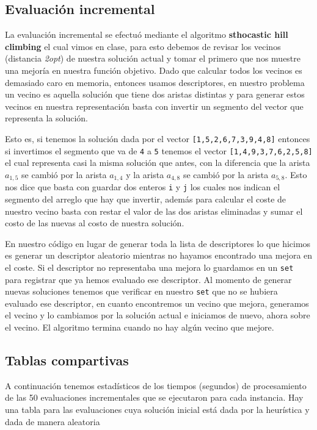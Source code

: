 \documentclass[11pt, letterpaper]{article}
\theoremstyle{definition}
\begin{document}
\subsection*{Evaluación incremental}
\noindent La evaluación incremental se efectuó mediante el algoritmo \textbf{sthocastic hill climbing} el cual vimos en clase, para esto debemos de revisar los vecinos (distancia \textit{2opt}) de nuestra solución actual y tomar el primero que nos muestre una mejoría en nuestra función objetivo. Dado que calcular todos los vecinos es demasiado caro en memoria, entonces usamos descriptores, en nuestro problema un vecino es aquella solución que tiene dos aristas distintas y para generar estos vecinos en nuestra representación basta con invertir un segmento del vector que representa la solución. 

\noindent Esto es, si tenemos la solución dada por el vector \lstinline|[1,5,2,6,7,3,9,4,8]| entonces si invertimos el segmento que va de \lstinline|4| a \lstinline|5| tenemos el vector \lstinline|[1,4,9,3,7,6,2,5,8]| el cual representa casi la misma solución que antes, con la diferencia que la arista $a_{1,5}$ se cambió por la arista $a_{1,4}$ y la arista $a_{4,8}$ se cambió por la arista $a_{5,8}$. Esto nos dice que basta con guardar dos enteros \lstinline|i| y \lstinline|j| los cuales nos indican el segmento del arreglo que hay que invertir, además para calcular el coste de nuestro vecino basta con restar el valor de las dos aristas eliminadas y sumar el costo de las nuevas al costo de nuestra solución. 

\noindent En nuestro código en lugar de generar toda la lista de descriptores lo que hicimos es generar un descriptor aleatorio mientras no hayamos encontrado una mejora en el coste. Si el descriptor no representaba una mejora lo guardamos en un \lstinline|set| para registrar que ya hemos evaluado ese descriptor. Al momento de generar nuevas soluciones tenemos que verificar en nuestro \lstinline|set| que no se hubiera evaluado ese descriptor, en cuanto encontremos un vecino que mejora, generamos el vecino y lo cambiamos por la solución actual e iniciamos de nuevo, ahora sobre el vecino. El algoritmo termina cuando no hay algún vecino que mejore.

\subsection*{Tablas compartivas}
\noindent A continuación tenemos estadísticos de los tiempos (segundos) de procesamiento de las 50 evaluaciones incrementales que se ejecutaron para cada instancia. Hay una tabla para las evaluaciones cuya solución inicial está dada por la heurística y dada de manera aleatoria
\end{document}

